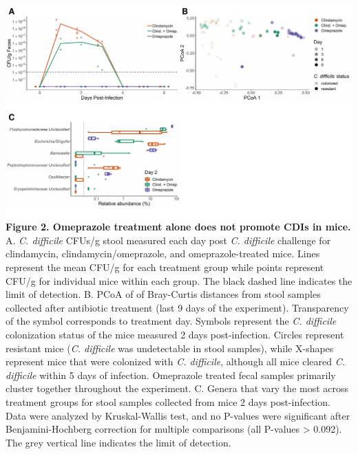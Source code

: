 \documentclass[11pt,]{article}
\begin{document}
\newpage

\includegraphics{figure_2.pdf} \textbf{Figure 2. Omeprazole treatment
alone does not promote CDIs in mice.} A. \emph{C. difficile} CFUs/g
stool measured each day post \emph{C. difficile} challenge for
clindamycin, clindamycin/omeprazole, and omeprazole-treated mice. Lines
represent the mean CFU/g for each treatment group while points represent
CFU/g for individual mice within each group. The black dashed line
indicates the limit of detection. B. PCoA of of Bray-Curtis distances
from stool samples collected after antibiotic treatment (last 9 days of
the experiment). Transparency of the symbol corresponds to treatment
day. Symbols represent the \emph{C. difficile} colonization status of
the mice measured 2 days post-infection. Circles represent resistant
mice (\emph{C. difficile} was undetectable in stool samples), while
X-shapes represent mice that were colonized with \emph{C. difficile},
although all mice cleared \emph{C. difficile} within 5 days of
infection. Omeprazole treated fecal samples primarily cluster together
throughout the experiment. C. Genera that vary the most across treatment
groups for stool samples collected from mice 2 days post-infection. Data
were analyzed by Kruskal-Wallis test, and no P-values were significant
after Benjamini-Hochberg correction for multiple comparisons (all
P-values \textgreater{} 0.092). The grey vertical line indicates the
limit of detection.

\newpage
\end{document}
